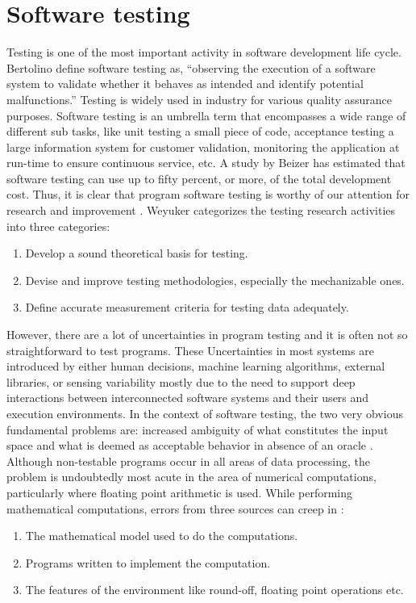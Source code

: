 \section{Software testing}
Testing is one of the most important activity in software development life cycle. Bertolino \cite{Bertolino2007} define software testing as, ``observing the execution of a software system to validate whether it behaves as intended and identify potential malfunctions.'' Testing is widely used in industry for various quality assurance purposes. Software testing is an umbrella term that encompasses a wide range of different sub tasks, like unit testing a small piece of code, acceptance testing a large information system for customer validation, monitoring the application at run-time to ensure continuous service, etc.\cite{Bertolino2007} A study by Beizer \cite{Beizer1990} has estimated that software testing can use up to fifty percent, or more, of the total development cost. Thus, it is clear that program software testing is worthy of our attention for research and improvement \cite{Beizer1990}.
Weyuker \cite{Weyuker} categorizes the testing research activities into three categories:
\begin{enumerate}
  \item Develop a sound theoretical basis for testing.
  \item Devise and improve testing methodologies, especially the mechanizable ones.
  \item Define accurate measurement criteria for testing data adequately.
\end{enumerate}

However,  there are a lot of uncertainties in program testing and it is often not so straightforward to test programs. These Uncertainties in most systems are introduced by either human decisions, machine learning algorithms, external libraries, or sensing variability mostly due to the need to support deep interactions between interconnected software systems and their users and execution environments. In the context of software testing, the two very obvious fundamental problems are: increased ambiguity of what constitutes the input space and what is deemed as acceptable behavior in absence of an oracle \cite{Chen2002,Elbaum2014}.
Although non-testable programs occur in all areas of data processing, the problem is undoubtedly most acute in the area of numerical computations, particularly where floating point arithmetic is used. While performing mathematical computations, errors from three sources can creep in \cite{Weyuker}:
\begin{enumerate}
  \item The mathematical model used to do the computations.
  \item Programs written to implement the computation.
  \item The features of the environment like round-off, floating point operations etc.
\end{enumerate}

